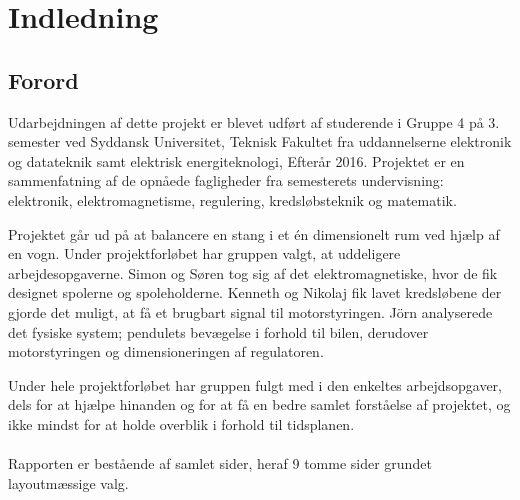\chapter{Indledning}

\section{Forord}\label{sec:forord}
Udarbejdningen af dette projekt er blevet udført af studerende i Gruppe 4 på 3. semester ved Syddansk Universitet, Teknisk Fakultet fra uddannelserne elektronik og datateknik samt elektrisk energiteknologi, Efterår 2016.
Projektet er en sammenfatning af de opnåede fagligheder fra semesterets undervisning: elektronik, elektromagnetisme, regulering, kredsløbsteknik og matematik.

Projektet går ud på at balancere en stang i et én dimensionelt rum ved hjælp af en vogn. Under projektforløbet har gruppen valgt, at uddeligere arbejdesopgaverne. Simon og Søren tog sig af det elektromagnetiske, hvor de fik designet spolerne og spoleholderne. Kenneth og Nikolaj fik lavet kredsløbene der gjorde det muligt, at få et brugbart signal til motorstyringen. Jörn analyserede det fysiske system; pendulets bevægelse i forhold til bilen, derudover motorstyringen og dimensioneringen af regulatoren.

Under hele projektforløbet har gruppen fulgt med i den enkeltes arbejdsopgaver, dels for at hjælpe hinanden og for at få en bedre samlet forståelse af projektet, og ikke mindst for at holde overblik i forhold til tidsplanen. 
\\ \\
Rapporten er bestående af samlet \pageref{LastPage} sider, heraf  9 tomme sider grundet layoutmæssige valg. 